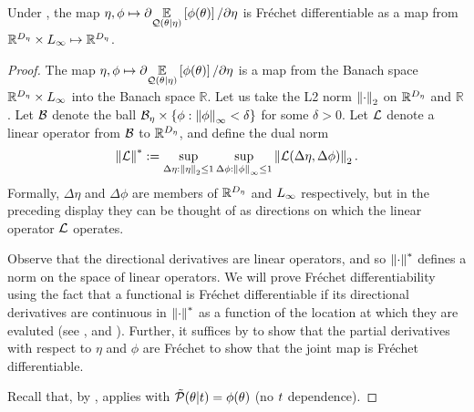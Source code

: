 \begin{lem}

Under , the map $\eta, \phi \mapsto \partial
\underset{\mathcal{Q}(\theta \vert \eta)}{\mathbb{E}}\left[\phi(\theta)\right] / \partial \eta$ is Fr{\'e}chet
differentiable as a map from $\mathbb{R}^{D_{\eta}} \times {L_{\infty}}  \mapsto
\mathbb{R}^{D_{\eta}}$.
%
\begin{proof}
%
The map $\eta, \phi \mapsto  \partial \underset{\mathcal{Q}(\theta \vert
\eta)}{\mathbb{E}}\left[\phi(\theta)\right] / \partial \eta$ is a map from the Banach space
$\mathbb{R}^{D_{\eta}} \times {L_{\infty}}$ into the Banach space $\mathbb{R}$. Let us
take the L2 norm $\left\Vert\cdot\right\Vert_2$ on $\mathbb{R}^{{D_{\eta}}}$ and $\mathbb{R}$.
Let $\mathcal{B}$ denote the ball $\mathcal{B}_\eta \times \{ \phi: \left\Vert\phi\right\Vert_{\infty} <
\delta\}$ for some $\delta > 0$.  Let $\mathcal{L}$ denote a linear operator from
$\mathcal{B}$ to $\mathbb{R}^{D_{\eta}}$, and define the dual norm
%
\begin{align*}
%
\norm{\linop}^* :=
    \sup_{\Delta \eta: \norm{\eta}_2 \le 1}
    \sup_{\Delta \phi: \norminf{\phi} \le 1}
     \norm{\linop(\Delta \eta, \Delta \phi)}_2.
%
\end{align*}
%
Formally, $\Delta \eta$ and $\Delta \phi$ are members of $\mathbb{R}^{D_{\eta}}$
and ${L_{\infty}}$ respectively, but in the preceding display they can be thought of as
directions on which the linear operator $\mathcal{L}$ operates.

Observe that the directional derivatives are linear operators, and so
$\left\Vert\cdot\right\Vert^*$ defines a norm on the space of linear operators. We will prove
Fr{\'e}chet differentiability using the fact that a functional is Fr{\'e}chet
differentiable if its directional derivatives are continuous in $\left\Vert\cdot\right\Vert^*$
as a function of the location at which they are evaluted  (see
\citet[Proposition 4.8(c)]{zeidler:2013:functional}, \citet[Corollary
1.4]{averbukh:1967:theory} and \citep[Appendix A]{reeds:1976:thesis}). Further,
it suffices by \citet[Proposition 4.14(c)]{zeidler:2013:functional} to show that
the partial derivatives with respect to $\eta$ and $\phi$ are Fr{\'e}chet to
show that the joint map is Fr{\'e}chet differentiable.

Recall that, by , 
applies with $\tilde{\mathcal{P}}(\theta \vert t) = \phi(\theta)$ (no $t$ dependence).


\end{proof}
\end{lem}
